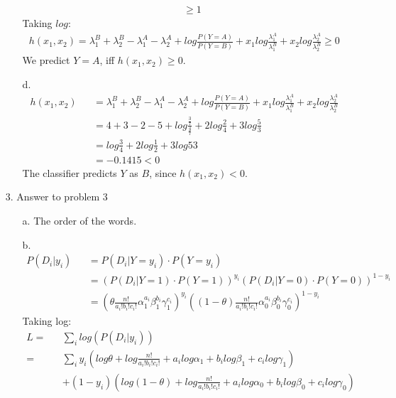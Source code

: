 \begin{enumerate}
\begin{enumerate}
\begin{eqnarray}
		&& \geq 1
		\end{eqnarray}
		Taking $log$:
		\begin{eqnarray}
		h(x_1,x_2) = \lambda_1^B + \lambda_2^B - \lambda_1^A - \lambda_2^A + log \frac{P(Y=A)}{P(Y=B)} + x_1 log \frac{\lambda_1^A}{\lambda_1^B} + x_2 log \frac{\lambda_2^A}{\lambda_2^B} \geq 0
		\end{eqnarray}
		We predict $Y=A$, iff $h(x_1,x_2)\geq 0$.\\
	\item[d.]
		\begin{eqnarray}
		h(x_1,x_2) && = \lambda_1^B + \lambda_2^B - \lambda_1^A - \lambda_2^A + log \frac{P(Y=A)}{P(Y=B)} + x_1 log \frac{\lambda_1^A}{\lambda_1^B} + x_2 log \frac{\lambda_2^A}{\lambda_2^B}\\
		&& = 4 + 3 - 2 - 5 + log \frac{\frac{3}{7}}{\frac{4}{7}} + 2log \frac{2}{4} + 3log \frac{5}{3}\\
		&& = log \frac{3}{4} + 2log \frac{1}{2} + 3log{5}{3} \\
		&& = -0.1415 < 0
		\end{eqnarray}
		The classifier predicts $Y$ as $B$, since $h(x_1,x_2) < 0$.\\
	\end{enumerate}
\item[3.] Answer to problem 3
	\begin{enumerate}
	\item[a.] The order of the words.\\
	\item[b.] 
		\begin{eqnarray}
		P(D_i|y_i) && = P(D_i|Y = y_i) \cdot P(Y=y_i)\\
		&& = (P(D_i|Y = 1) \cdot P(Y=1))^{y_i}(P(D_i|Y = 0) \cdot P(Y=0))^{1-y_i}\\
		&& = (\theta \frac{n!}{a_i!b_i!c_i!} \alpha_1 ^{a_i} \beta_1 ^{b_i} \gamma_1 ^{c_i})^{y_i}((1 - \theta) \frac{n!}{a_i!b_i!c_i!} \alpha_0 ^{a_i} \beta_0 ^{b_i} \gamma_0 ^{c_i})^{1-y_i}
		\end{eqnarray}
		Taking log:
		\begin{eqnarray}
		L = && \sum_{i}log(P(D_i|y_i))\\
		= && \sum_{i} y_i (log \theta + log \frac{n!}{a_i!b_i!c_i!} + a_i log \alpha_1 + b_i log \beta_1 + c_i log \gamma_1)\\
		&& + (1-y_i) (log (1-\theta) + log \frac{n!}{a_i!b_i!c_i!} + a_i log \alpha_0 + b_i log \beta_0 + c_i log \gamma_0)
		\end{eqnarray}
		\\

\end{enumerate}
\end{enumerate}
